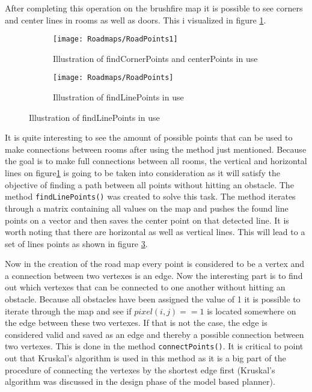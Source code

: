 \documentclass[../Head/Main.tex]{subfiles}
\begin{document}
After completing this operation on the brushfire map it is possible to see corners and center lines in rooms as well as doors. This i visualized in figure \ref{fig:CornersAndCentersOfRoom}.
  
  \begin{figure}[H]
   \begin{subfigure}[b]{0.49\textwidth}
    \centering
    \texttt{[image: Roadmaps/RoadPoints1]}
    \caption{Illustration of findCornerPoints and centerPoints in use}
    \label{fig:CornersAndCentersOfRoom}
  \end{subfigure}
  \hfill
   \begin{subfigure}[b]{0.49\textwidth}
    \centering
    \texttt{[image: Roadmaps/RoadPoints]}
    \caption{Illustration of findLinePoints in use}
    \label{fig:LinePoints}
  \end{subfigure}
  \end{figure}

It is quite interesting to see the amount of possible points that can be used to make connections between rooms after using the method just mentioned. Because the goal is to make full connections between all rooms, the vertical and horizontal lines on figure\ref{fig:CornersAndCentersOfRoom} is going to be taken into consideration as it will satisfy the objective of finding a path between all points without hitting an obstacle. The method \texttt{findLinePoints()} was created to solve this task. The method iterates through a matrix containing all values on the map and pushes the found line points on a vector and then saves the center point on that detected line. It is worth noting that there are horizontal as well as vertical lines. This will lead to a set of lines points as shown in figure \ref{fig:LinePoints}. 

Now in the creation of the road map every point is considered to be a vertex and a connection between two vertexes is an edge. Now the interesting part is to find out which vertexes that can be connected to one another without hitting an obstacle. Because all obstacles have been assigned the value of 1 it is possible to iterate through the map and see if $pixel(i,j) == 1$ is located somewhere on the edge between these two vertexes. If that is not the case, the edge is considered valid and saved as an edge and thereby a possible connection between two vertexes. This is done in the method \texttt{connectPoints()}. It is critical to point out that Kruskal's algorithm is used in this method as it is a big part of the procedure of connecting the vertexes by the shortest edge first (Kruskal's algorithm was discussed in the design phase of the model based planner). 
\end{document}
